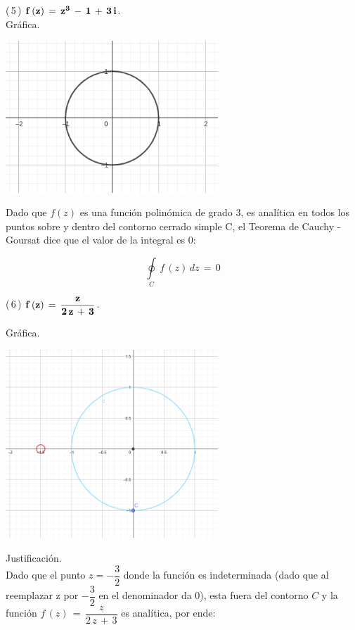 \documentclass[a4paper,11pt,openany]{book}
\begin{document}
\textcolor{ao(english)}{(\,5\,)} $\bf{f\,(z)\,=\,z^{3}\,-\,1\,+\,3\,i}$.\\

\textcolor{ao(english)}{} Gráfica.

\begin{center}
     \includegraphics[width=8cm]{figura-5.png}
\end{center}

Dado que $f(z)$ es una función polinómica de grado 3, es analítica en todos los puntos sobre y dentro del contorno cerrado simple C, el Teorema de Cauchy - Goursat dice que el valor de la integral es 0:

$$\oint\limits_{C}\,f\,(z)\,dz\,=\,0$$

\textcolor{ao(english)}{(\,6\,)} $\bf{f\,(z)\,=\,\dfrac{z}{2\,z\,+\,3}}$.

\textcolor{ao(english)}{} Gráfica.

\begin{center}
     \includegraphics[width=8cm]{Gra-Ej-6.png}
\end{center}

\textcolor{ao(english)}{} Justificación.\\

Dado que el punto $z=-\dfrac{3}{2}$ donde la función es indeterminada (dado que al reemplazar z por $-\dfrac{3}{2}$ en el denominador da 0), esta fuera del contorno $C$
y la función  $f\,(z)\,=\,\dfrac{z}{2\,z\,+\,3}$ es analítica, por ende:
\end{document}
